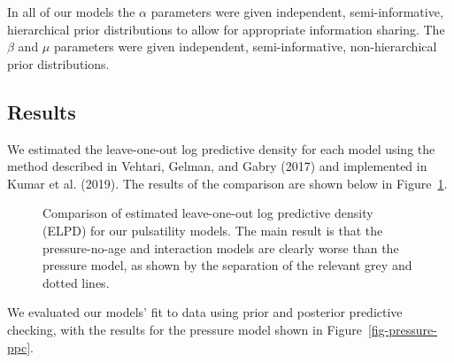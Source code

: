 \documentclass[
  letterpaper,
  DIV=11,
  numbers=noendperiod,
  oneside]{scrartcl}
\theoremstyle{plain}
\theoremstyle{remark}
\begin{document}
In all of our models the \(\alpha\) parameters were given independent,
semi-informative, hierarchical prior distributions to allow for
appropriate information sharing. The \(\beta\) and \(\mu\) parameters
were given independent, semi-informative, non-hierarchical prior
distributions.

\subsection{Results}\label{results-1}

We estimated the leave-one-out log predictive density for each model
using the method described in Vehtari, Gelman, and Gabry (2017) and
implemented in Kumar et al. (2019). The results of the comparison are
shown below in Figure~\ref{fig-pulsatility-elpd-comparison}.

\begin{figure}


\caption{\label{fig-pulsatility-elpd-comparison}Comparison of estimated
leave-one-out log predictive density (ELPD) for our pulsatility models.
The main result is that the pressure-no-age and interaction models are
clearly worse than the pressure model, as shown by the separation of the
relevant grey and dotted lines.}

\end{figure}%

We evaluated our models' fit to data using prior and posterior
predictive checking, with the results for the pressure model shown in
Figure~\ref{fig-pressure-ppc}.
\end{document}

